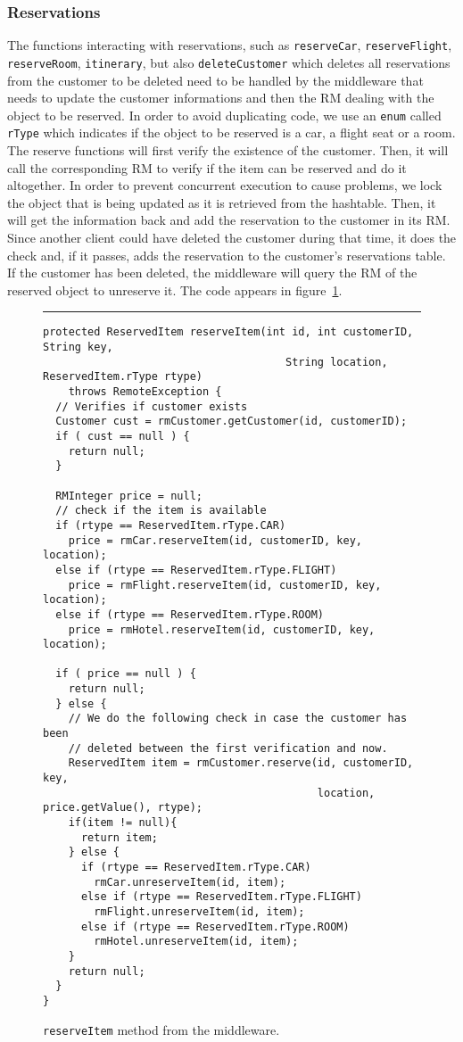 \documentclass[12pt]{article}
\theoremstyle{plain}%
\theoremstyle{definition}
\theoremstyle{remark}
\newcommand{\java}[1]{{\lstinline!#1!}}
\newenvironment{figureone}[1]{%
  \def\deffigurecaption{#1}%
  \begin{figure}[htbp]%
  \begin{center}%
  \begin{minipage}{\columnwidth}%
  \hrule \vspace*{2ex}%
}{%
  \end{minipage}%
  \end{center}%
  \caption{\deffigurecaption}%
  \end{figure}%
}
\begin{document}
\subsubsection*{Reservations}
The functions interacting with reservations, such as
\java{reserveCar}, \java{reserveFlight}, \java{reserveRoom},
\java{itinerary}, but also \java{deleteCustomer} which deletes all
reservations from the customer to be deleted need to be handled by the
middleware that needs to update the customer informations and then the
RM dealing with the object to be reserved. In order to avoid
duplicating code, we use an \java{enum} called \java{rType} which
indicates if the object to be reserved is a car, a flight seat or a
room. The reserve functions will 
first verify the existence of the customer. Then, it will call the
corresponding RM to verify if the item can be reserved and do it
altogether. In order to prevent concurrent execution to cause
problems, we lock the object that is being updated as it is retrieved
from the hashtable. Then, it will get the information back and add the
reservation to the customer in its RM. Since another client could have
deleted the customer during that time, it does the check and, if it
passes, adds the reservation to the customer's reservations table. If
the customer has been deleted, the middleware will query the RM of the
reserved object to unreserve it. 
The code appears in figure~\ref{fig:reserve}. 
\begin{figureone}{\java{reserveItem} method from the middleware. \label{fig:reserve}}
\begin{lstlisting}
protected ReservedItem reserveItem(int id, int customerID, String key, 
                                      String location, ReservedItem.rType rtype)
    throws RemoteException {
  // Verifies if customer exists
  Customer cust = rmCustomer.getCustomer(id, customerID);
  if ( cust == null ) {
    return null;
  } 

  RMInteger price = null;
  // check if the item is available
  if (rtype == ReservedItem.rType.CAR)
    price = rmCar.reserveItem(id, customerID, key, location);
  else if (rtype == ReservedItem.rType.FLIGHT)
    price = rmFlight.reserveItem(id, customerID, key, location);
  else if (rtype == ReservedItem.rType.ROOM)
    price = rmHotel.reserveItem(id, customerID, key, location);

  if ( price == null ) {
    return null;
  } else {  
    // We do the following check in case the customer has been
    // deleted between the first verification and now.
    ReservedItem item = rmCustomer.reserve(id, customerID, key,
                                           location, price.getValue(), rtype);
    if(item != null){
      return item;
    } else {
      if (rtype == ReservedItem.rType.CAR)
        rmCar.unreserveItem(id, item);
      else if (rtype == ReservedItem.rType.FLIGHT)
        rmFlight.unreserveItem(id, item);
      else if (rtype == ReservedItem.rType.ROOM)
        rmHotel.unreserveItem(id, item);
    }
    return null;
  }
}

\end{lstlisting}
\end{figureone}
\end{document}
